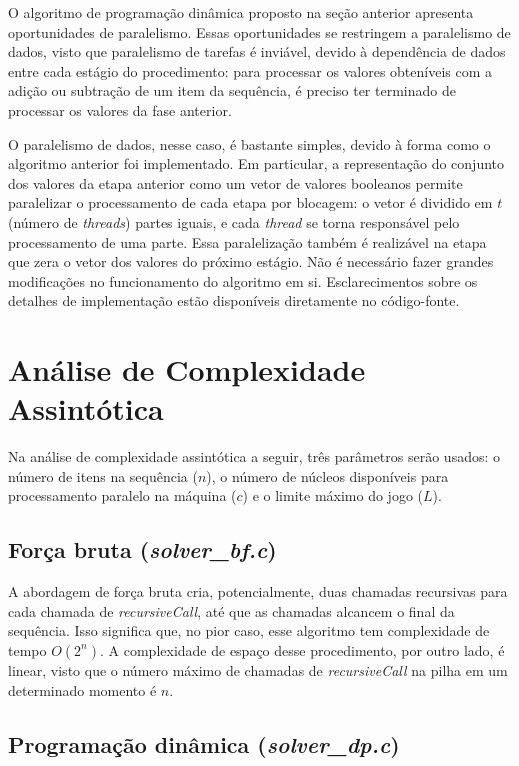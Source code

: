 \documentclass[10pt,a4paper]{article}
\numberwithin{equation}{section}
\begin{document}
O algoritmo de programação dinâmica proposto na seção anterior apresenta oportunidades de paralelismo. Essas oportunidades se restringem a paralelismo de dados, visto que paralelismo de tarefas é inviável, devido à dependência de dados entre cada estágio do procedimento: para processar os valores obteníveis com a adição ou subtração de um item da sequência, é preciso ter terminado de processar os valores da fase anterior.

O paralelismo de dados, nesse caso, é bastante simples, devido à forma como o algoritmo anterior foi implementado. Em particular, a representação do conjunto dos valores da etapa anterior como um vetor de valores booleanos permite paralelizar o processamento de cada etapa por blocagem: o vetor é dividido em $t$ (número de \emph{threads}) partes iguais, e cada \emph{thread} se torna responsável pelo processamento de uma parte. Essa paralelização também é realizável na etapa que zera o vetor dos valores do próximo estágio. Não é necessário fazer grandes modificações no funcionamento do algoritmo em si. Esclarecimentos sobre os detalhes de implementação estão disponíveis diretamente no código-fonte.

\section{Análise de Complexidade Assintótica}

Na análise de complexidade assintótica a seguir, três parâmetros serão usados: o número de itens na sequência ($n$), o número de núcleos disponíveis para processamento paralelo na máquina ($c$) e o limite máximo do jogo ($L$).

\subsection{Força bruta (\emph{solver\_bf.c})}

A abordagem de força bruta cria, potencialmente, duas chamadas recursivas para cada chamada de \emph{recursiveCall}, até que as chamadas alcancem o final da sequência. Isso significa que, no pior caso, esse algoritmo tem complexidade de tempo $O(2^n)$. A complexidade de espaço desse procedimento, por outro lado, é linear, visto que o número máximo de chamadas de \emph{recursiveCall} na pilha em um determinado momento é $n$.

\subsection{Programação dinâmica (\emph{solver\_dp.c})}
\end{document}
